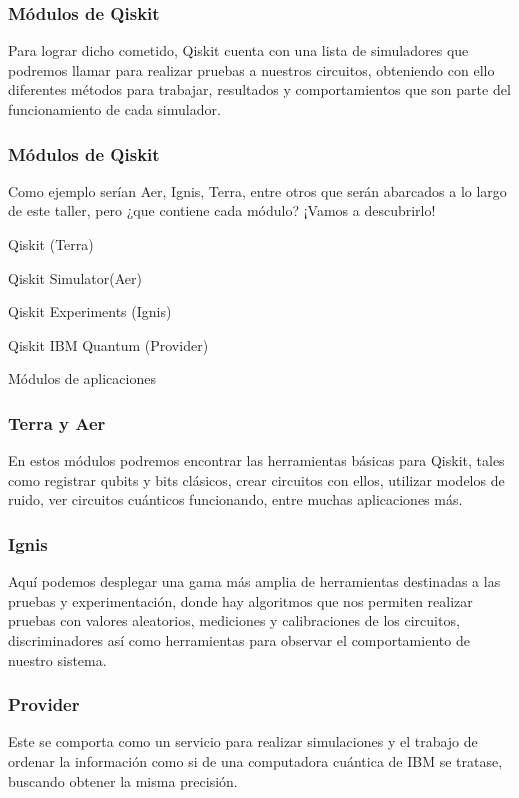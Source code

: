 \documentclass[spanish]{beamer}
\begin{document}
\newpage\justify\setlength{\parskip}{5mm}
\begin{frame}\frametitle{Módulos de Qiskit} 
Para lograr dicho cometido, Qiskit cuenta con una lista de simuladores que podremos llamar para realizar pruebas a nuestros circuitos, obteniendo con ello diferentes métodos para trabajar, resultados y comportamientos que son parte del funcionamiento de cada simulador. 
\end{frame} 

\newpage\justify\setlength{\parskip}{5mm}
\begin{frame}\frametitle{Módulos de Qiskit} 
Como ejemplo serían Aer, Ignis, Terra, entre otros que serán abarcados a lo largo de este taller, pero ¿que contiene cada módulo? ¡Vamos a descubrirlo!
\begin{itemsize}
\item Qiskit (Terra)
    \item Qiskit Simulator(Aer)
    \item Qiskit Experiments (Ignis)
    \item Qiskit IBM Quantum (Provider)
    \item Módulos de aplicaciones
\end{itemsize}
\end{frame} 

\newpage\justify\setlength{\parskip}{5mm}
\begin{frame}\frametitle{Terra y Aer} 
En estos módulos podremos encontrar las herramientas básicas para Qiskit, tales como registrar qubits y bits clásicos, crear circuitos con ellos, utilizar modelos de ruido, ver circuitos cuánticos funcionando, entre muchas aplicaciones más.
\end{frame} 

\newpage\justify\setlength{\parskip}{5mm}
\begin{frame}\frametitle{Ignis} 
Aquí podemos desplegar una gama más amplia de herramientas destinadas a las pruebas y experimentación, donde hay algoritmos que nos permiten realizar pruebas con valores aleatorios, mediciones y calibraciones de los circuitos, discriminadores  así como herramientas para observar el comportamiento de nuestro sistema.
\end{frame} 

\newpage\justify\setlength{\parskip}{5mm}
\begin{frame}\frametitle{Provider} 
Este se comporta como un servicio para realizar simulaciones y el trabajo de ordenar la información como si de una computadora cuántica de IBM se tratase, buscando obtener la misma precisión.
\end{frame} 
\end{document}

